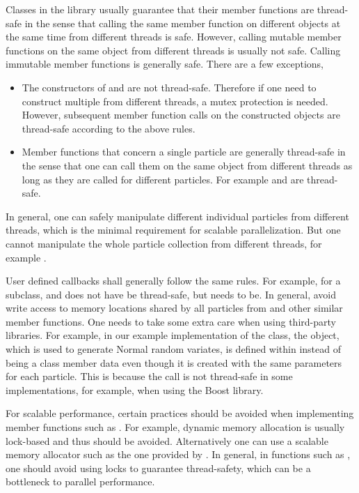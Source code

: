 Classes in the \vsmc library usually guarantee that their member functions are
thread-safe in the sense that calling the same member function on different
objects at the same time from different threads is safe. However, calling
mutable member functions on the same object from different threads is usually
not safe. Calling immutable member functions is generally safe. There are a
few exceptions,
\begin{itemize}
  \item The constructors of  and  are not
    thread-safe. Therefore if one need to construct multiple 
    from different threads, a mutex protection is needed. However, subsequent
    member function calls on the constructed objects are thread-safe according
    to the above rules.
  \item Member functions that concern a single particle are generally
    thread-safe in the sense that one can call them on the same object from
    different threads as long as they are called for different particles. For
    example  and  are
    thread-safe.
\end{itemize}
In general, one can safely manipulate different individual particles from
different threads, which is the minimal requirement for scalable
parallelization. But one cannot manipulate the whole particle collection from
different threads, for example .

User defined callbacks shall generally follow the same rules. For example, for
a  subclass,  and  does
not have be thread-safe, but  needs to be. In general, avoid
write access to memory locations shared by all particles from
 and other similar member functions. One needs to take some
extra care when using third-party libraries. For example, in our example
implementation of the  class, the  object, which is
used to generate Normal random variates, is defined within 
instead of being a class member data even though it is created with the same
parameters for each particle. This is because the call 
is not thread-safe in some implementations, for example, when using the Boost
library.

For scalable performance, certain practices should be avoided when
implementing member functions such as . For example, dynamic
memory allocation is usually lock-based and thus should be avoided.
Alternatively one can use a scalable memory allocator such as the one provided
by \tbb. In general, in functions such as , one should avoid
using locks to guarantee thread-safety, which can be a bottleneck to parallel
performance.


